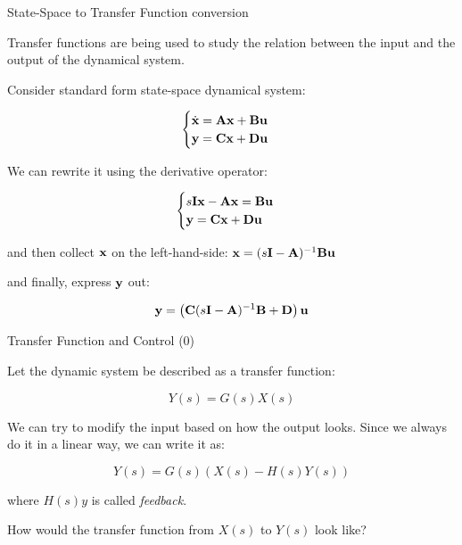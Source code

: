 \documentclass{beamer}
\begin{document}
\begin{frame}{State-Space to Transfer Function conversion}
\begin{flushleft}

Transfer functions are being used to study the relation between the input and the output of the dynamical system.

\bigskip

Consider standard form state-space dynamical system:

\begin{equation}
\begin{cases}
\dot{\mathbf{x}} = \mathbf{A}\mathbf{x} + \mathbf{B}\mathbf{u} \\
     \mathbf{y}  = \mathbf{C}\mathbf{x} + \mathbf{D}\mathbf{u}
\end{cases}
\end{equation}

We can rewrite it using the derivative operator:

\begin{equation}
\begin{cases}
s\mathbf{I}\mathbf{x} -\mathbf{A}\mathbf{x} = \mathbf{B}\mathbf{u} \\
\mathbf{y}  = \mathbf{C}\mathbf{x} + \mathbf{D}\mathbf{u}
\end{cases}
\end{equation}

and then collect $\mathbf{x}$ on the left-hand-side: $\mathbf{x} = (s\mathbf{I} -\mathbf{A})^{-1} \mathbf{B}\mathbf{u}$

and finally, express $\mathbf{y}$ out:

\begin{equation}
\mathbf{y}  = \left( \mathbf{C}(s\mathbf{I} -\mathbf{A})^{-1} \mathbf{B} + \mathbf{D} \right) \mathbf{u}
\end{equation}

\end{flushleft}
\end{frame}



\begin{frame}{Transfer Function and Control (0)}
	\begin{flushleft}
		
		Let the dynamic system be described as a transfer function:
		
		\begin{equation}
			Y(s) = G(s) X(s)
		\end{equation}
		
		We can try to modify the input based on how the output looks. Since we always do it in a linear way, we can write it as:
		
		\begin{equation}
			Y(s) = G(s) (X(s) - H(s) Y(s))
		\end{equation}
		
		where $H(s) y$ is called \emph{feedback}.
		
		\bigskip
		
		How would the transfer function from $X(s)$ to $Y(s) $ look like? 
		
	\end{flushleft}
\end{frame}
\end{document}
